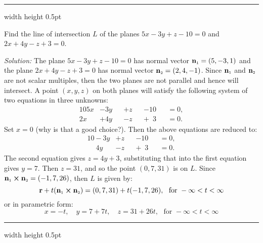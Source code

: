 \vspace{4mm}
\hrule width \textwidth height 0.5pt
\begin{exmp}\label{exmp:planeinter}
 Find the line of intersection $L$ of the planes $5x - 3y + z - 10 = 0$ and $2x + 4y - z + 3 = 0$.\vspace{1mm}
 \par\noindent\emph{Solution:} The plane $5x - 3y + z - 10 = 0$ has normal vector $\textbf{n}_{\scriptscriptstyle 1} = (5,-3,1)$ and
 the plane $2x + 4y - z + 3 = 0$ has normal vector $\textbf{n}_{\scriptscriptstyle 2} = (2,4,-1)$. Since $\textbf{n}_{\scriptscriptstyle 1}$ and
 $\textbf{n}_{\scriptscriptstyle 2}$ are not scalar multiples, then the two planes are not parallel and hence will intersect. A
 point $(x,y,z)$ on both planes will satisfy the following system of two equations in three unknowns:
 \begin{alignat*}{10}
  5x &- 3y &&+ z &&- 10 &&= 0,\\
  2x &+ 4y &&- z &&+ \phantom{1}3 &&= 0.
 \end{alignat*}
 Set $x = 0$ (why is that a good choice?). Then the above equations are reduced to:
 \begin{alignat*}{10}
  -3y &+ z &&- 10 &&= 0,\\
  \phantom{-}4y &- z &&+ \phantom{1}3 &&= 0.
 \end{alignat*}
 The second equation gives $z = 4y + 3$, substituting that into the first equation gives $y = 7$. Then $z = 31$,
 and so the point $(0,7,31)$ is on $L$. Since $\textbf{n}_{\scriptscriptstyle 1} \bm{\times} \textbf{n}_{\scriptscriptstyle 2} = (-1,7,26)$,
 then $L$ is given by:
 \begin{displaymath}
  \textbf{r} + t(\textbf{n}_{\scriptscriptstyle 1} \bm{\times} \textbf{n}_{\scriptscriptstyle 2}) = (0,7,31) + t(-1,7,26), \text{~~for~}
  -\infty < t < \infty
 \end{displaymath}
 or in parametric form:
 \begin{displaymath}
  x = -t, \quad y = 7 + 7t, \quad z = 31 +26t, \text{~~for~} -\infty < t < \infty
 \end{displaymath} 
\end{exmp}
\hrule width \textwidth height 0.5pt

